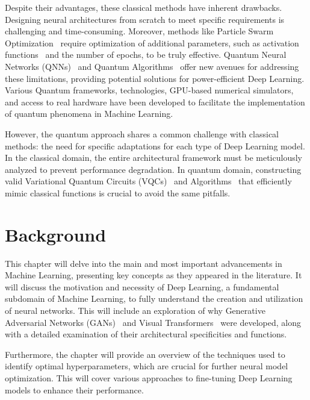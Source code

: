 \documentclass[12pt,a4paper]{report}
\begin{document}
Despite their advantages, these classical methods have inherent drawbacks. Designing neural architectures from scratch to meet specific requirements is challenging and time-consuming. Moreover, methods like Particle Swarm Optimization~\cite{7986470} require optimization of additional parameters, such as activation functions~\cite{han1995influence, NIPS2017_a96b65a7, xu2020reluplex} and the number of epochs, to be truly effective. Quantum Neural Networks (QNNs)~\cite{abbas2021power} and Quantum Algorithms~\cite{cerezo2021variational} offer new avenues for addressing these limitations, providing potential solutions for power-efficient Deep Learning. Various Quantum frameworks, technologies, GPU-based numerical simulators, and access to real hardware have been developed to facilitate the implementation of quantum phenomena in Machine Learning.

However, the quantum approach shares a common challenge with classical methods: the need for specific adaptations for each type of Deep Learning model.
In the classical domain, the entire architectural framework must be meticulously analyzed to prevent performance degradation. In quantum domain, constructing valid Variational Quantum Circuits (VQCs)~\cite{benedetti2019parameterized} and Algorithms~\cite{cerezo2021variational} that efficiently mimic classical functions is crucial to avoid the same pitfalls.
\chapter{Background}\vspace{-12pt}
This chapter will delve into the main and most important advancements in Machine Learning, presenting key concepts as they appeared in the literature. It will discuss the motivation and necessity of Deep Learning, a fundamental subdomain of Machine Learning, to fully understand the creation and utilization of neural networks. This will include an exploration of why Generative Adversarial Networks (GANs)~\cite{goodfellow2014generative} and Visual Transformers~\cite{vaswani2017attention, dosovitskiy2020} were developed, along with a detailed examination of their architectural specificities and functions.

Furthermore, the chapter will provide an overview of the techniques used to identify optimal hyperparameters, which are crucial for further neural model optimization. This will cover various approaches to fine-tuning Deep Learning models to enhance their performance.
\end{document}
